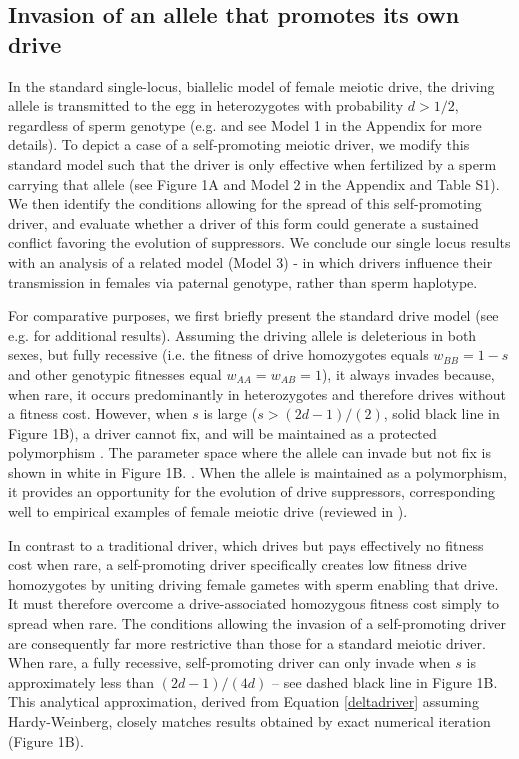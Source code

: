\documentclass{pnastwo}
\begin{document}
\begin{article}
\subsection{Invasion of an allele that promotes its own drive}
In the standard single-locus, biallelic model of female meiotic drive,
the driving allele is transmitted to the egg in heterozygotes with
probability  $d > 1/2$, regardless of sperm genotype (e.g. \cite{Ubeda2004} and see Model 1 in the Appendix for more details). 
To depict a case of a self-promoting meiotic driver,  we modify this standard model such 
	that the driver is only effective when fertilized by a sperm carrying that allele (see Figure 1A and Model 2 	in the Appendix and Table S1). 
We then identify the conditions allowing for the spread of this self-promoting driver, 
	and evaluate whether a driver of this form could generate a sustained conflict favoring the evolution of suppressors. 
We conclude our single locus results with an analysis of a related model (Model 3) - in which
drivers influence their transmission in females via paternal genotype,
rather than sperm haplotype. 

For comparative purposes, we first briefly present the standard drive model 
	(see e.g. \cite{Prout1973,Ubeda2004} for additional results). 
Assuming the driving allele is deleterious in both sexes, but fully recessive 
	(i.e. the fitness of drive homozygotes equals $w_{BB}=1-s$ and other genotypic fitnesses equal $w_{AA}=w_{AB}=1$), 
	it always invades because, when rare, it occurs predominantly in heterozygotes and therefore drives without a fitness cost. 
However, when $s$ is large ($s>(2d-1)/(2)$, solid black line in Figure 1B), a driver cannot fix, and
will be maintained as a protected polymorphism \cite{Prout1973}. 
The parameter space where the allele can invade but not fix is shown in white
        in Figure 1B. . 
When the allele is maintained as a polymorphism, it provides an opportunity for the evolution of
	drive suppressors, corresponding well to empirical examples of
        female meiotic drive (reviewed in \cite{Burt2006}). 

In contrast to a traditional driver, which drives but pays effectively
	no fitness cost when rare, 
a self-promoting driver specifically creates low fitness drive homozygotes 
	by uniting driving female gametes with sperm enabling that drive.
It must therefore overcome a drive-associated homozygous fitness cost simply to spread when rare. 
The conditions allowing the invasion of a self-promoting driver
 	are consequently far more restrictive than those for a standard meiotic driver.
When rare, a fully recessive, self-promoting driver can only invade when $s$ 
	is approximately less than $(2 d - 1)/(4 d)$ -- see dashed black line in Figure 1B. 
This analytical approximation, derived from Equation \eqref{deltadriver} assuming Hardy-Weinberg, 
	closely matches results obtained by exact numerical iteration (Figure 1B). 




\end{article}
\end{document}
